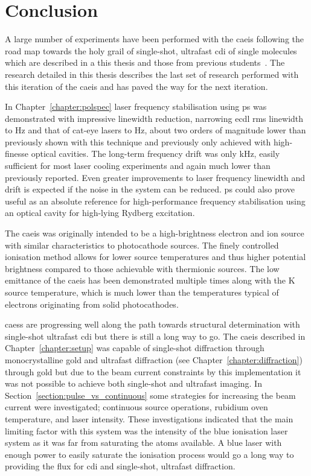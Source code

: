 \chapter{Conclusion}

A large number of experiments have been performed with the \gls{caeis} following the road map towards the holy grail of single-shot, ultrafast \gls{cdi} of single molecules which are described in a this thesis and those from previous students~\cite{sheludko_shaped_2010,bell_cold_2011,saliba_cold_2011,mcculloch_generation_2013,taylor_rydberg_2013,tielen_development_2015,murphy_measurement_2017,speirs_electron_2017}.
The research detailed in this thesis describes the last set of research performed with this iteration of the \gls{caeis} and has paved the way for the next iteration.

In Chapter~\ref{chapter:polspec} laser frequency stabilisation using \gls{ps} was demonstrated with impressive linewidth reduction, narrowing \gls{ecdl} \gls{rms} linewidth to \unit[600]{Hz} and that of cat-eye lasers to \unit[360]{Hz}, about two orders of magnitude lower than previously shown with this technique and previously only achieved with high-finesse optical cavities.
The long-term frequency drift was only \unit[51]{kHz}, easily sufficient for most laser cooling experiments and again much lower than previously reported.
Even greater improvements to laser frequency linewidth and drift is expected if the noise in the system can be reduced.
\Gls{ps} could also prove useful as an absolute reference for high-performance frequency stabilisation using an optical cavity for high-lying Rydberg excitation.

The \gls{caeis} was originally intended to be a high-brightness electron and ion source with similar characteristics to photocathode sources.
The finely controlled ionisation method allows for lower source temperatures and thus higher potential brightness compared to those achievable with thermionic sources.
The low emittance of the \gls{caeis} has been demonstrated multiple times along with the \unit[10]{K} source temperature, which is much lower than the temperatures typical of electrons originating from solid photocathodes.

\Glspl{caes} are progressing well along the path towards structural determination with single-shot ultrafast \gls{cdi} but there is still a long way to go.
The \gls{caeis} described in Chapter~\ref{chapter:setup} was capable of single-shot diffraction through monocrystalline gold and ultrafast diffraction (see Chapter~\ref{chapter:diffraction}) through gold but due to the beam current constraints by this implementation it was not possible to achieve both single-shot and ultrafast imaging.
In Section~\ref{section:pulse_vs_continuous} some strategies for increasing the beam current were investigated; continuous source operations, rubidium oven temperature, and laser intensity.
These investigations indicated that the main limiting factor with this system was the intensity of the blue ionisation laser system as it was far from saturating the atoms available.
A blue laser with enough power to easily saturate the ionisation process would go a long way to providing the flux for \gls{cdi} and single-shot, ultrafast diffraction.

